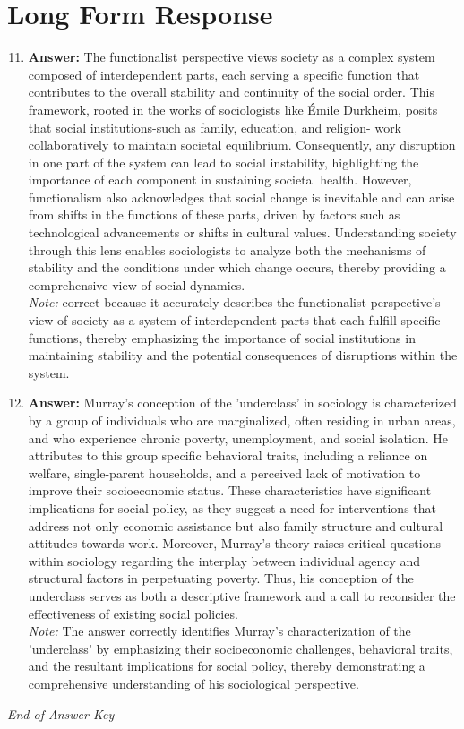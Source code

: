 \documentclass[12pt]{article}
\begin{document}
\section*{Long Form Response}
\begin{enumerate}[label=\arabic*.]
\setcounter{enumi}{10}
\item \textbf{Answer:} The functionalist perspective views society as a complex system composed of interdependent parts, each serving a specific function that contributes to the overall stability and continuity of the social order. This framework, rooted in the works of sociologists like Émile Durkheim, posits that social institutions-such as family, education, and religion- work collaboratively to maintain societal equilibrium. Consequently, any disruption in one part of the system can lead to social instability, highlighting the importance of each component in sustaining societal health. However, functionalism also acknowledges that social change is inevitable and can arise from shifts in the functions of these parts, driven by factors such as technological advancements or shifts in cultural values. Understanding society through this lens enables sociologists to analyze both the mechanisms of stability and the conditions under which change occurs, thereby providing a comprehensive view of social dynamics.
\\ \textit{Note:} correct because it accurately describes the functionalist perspective's view of society as a system of interdependent parts that each fulfill specific functions, thereby emphasizing the importance of social institutions in maintaining stability and the potential consequences of disruptions within the system.
\item \textbf{Answer:} Murray's conception of the 'underclass' in sociology is characterized by a group of individuals who are marginalized, often residing in urban areas, and who experience chronic poverty, unemployment, and social isolation. He attributes to this group specific behavioral traits, including a reliance on welfare, single-parent households, and a perceived lack of motivation to improve their socioeconomic status. These characteristics have significant implications for social policy, as they suggest a need for interventions that address not only economic assistance but also family structure and cultural attitudes towards work. Moreover, Murray's theory raises critical questions within sociology regarding the interplay between individual agency and structural factors in perpetuating poverty. Thus, his conception of the underclass serves as both a descriptive framework and a call to reconsider the effectiveness of existing social policies.
\\ \textit{Note:} The answer correctly identifies Murray's characterization of the 'underclass' by emphasizing their socioeconomic challenges, behavioral traits, and the resultant implications for social policy, thereby demonstrating a comprehensive understanding of his sociological perspective.
\end{enumerate}

\vfill
\noindent\textit{End of Answer Key}
\end{document}
